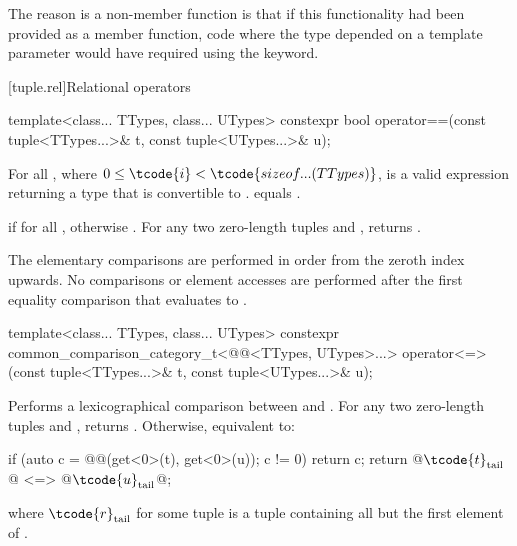\pnum
\begin{note}
The reason  is a
non-member function is that if this functionality had been
provided as a member function, code where the type
depended on a template parameter would have required using
the  keyword.
\end{note}

[tuple.rel]{Relational operators}

%
\begin{itemdecl}
template<class... TTypes, class... UTypes>
  constexpr bool operator==(const tuple<TTypes...>& t, const tuple<UTypes...>& u);
\end{itemdecl}

\begin{itemdescr}
\pnum
\mandates
For all ,
where $0 \leq \tcode{i} < \tcode{sizeof...(TTypes)}$,
 is a valid expression
returning a type that is convertible to .
 equals
.

\pnum
\returns
{} if  for all
, otherwise .
For any two zero-length tuples  and ,  returns .

\pnum
\remarks
The elementary comparisons are performed in order from the
zeroth index upwards.  No comparisons or element accesses are
performed after the first equality comparison that evaluates to
.
\end{itemdescr}

%
\begin{itemdecl}
template<class... TTypes, class... UTypes>
  constexpr common_comparison_category_t<@@<TTypes, UTypes>...>
    operator<=>(const tuple<TTypes...>& t, const tuple<UTypes...>& u);
\end{itemdecl}

\begin{itemdescr}
\pnum
\effects
Performs a lexicographical comparison between  and .
For any two zero-length tuples  and ,
 returns .
Otherwise, equivalent to:
\begin{codeblock}
if (auto c = @@(get<0>(t), get<0>(u)); c != 0) return c;
return @$\tcode{t}_\mathrm{tail}$@ <=> @$\tcode{u}_\mathrm{tail}$@;
\end{codeblock}
where $\tcode{r}_\mathrm{tail}$ for some tuple 
is a tuple containing all but the first element of .
\end{itemdescr}

